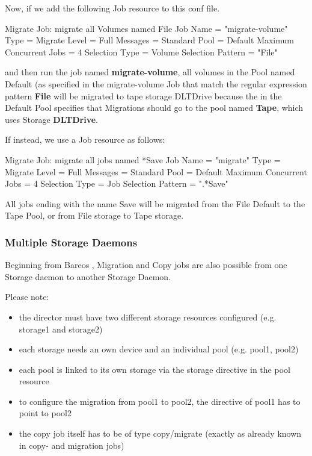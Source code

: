 Now, if we add the following Job resource to this conf file.

\begin{bconfig}{Migrate Job: migrate all Volumes named File}
Job {
  Name = "migrate-volume"
  Type = Migrate
  Level = Full
  Messages = Standard
  Pool = Default
  Maximum Concurrent Jobs = 4
  Selection Type = Volume
  Selection Pattern = "File"
}
\end{bconfig}

and then run the job named {\bf migrate-volume}, all volumes in the Pool
named Default (as specified in the migrate-volume Job that match the
regular expression pattern {\bf File} will be migrated to tape storage
DLTDrive because the  in the Default Pool specifies that
Migrations should go to the pool named {\bf Tape}, which uses
Storage {\bf DLTDrive}.

If instead, we use a Job resource as follows:

\begin{bconfig}{Migrate Job: migrate all jobs named *Save}
Job {
  Name = "migrate"
  Type = Migrate
  Level = Full
  Messages = Standard
  Pool = Default
  Maximum Concurrent Jobs = 4
  Selection Type = Job
  Selection Pattern = ".*Save"
}
\end{bconfig}

All jobs ending with the name Save will be migrated from the File Default to
the Tape Pool, or from File storage to Tape storage.

\subsubsection{Multiple Storage Daemons}
    \label{sec:CopyMigrationJobsMultipleStorageDaemons}

Beginning from Bareos , 
Migration and Copy jobs are also possible from one Storage daemon to another Storage Daemon.

Please note:
\begin{itemize}
 \item the director must have two different storage resources configured (e.g. storage1 and storage2)
    \item each storage needs an own device and an individual pool (e.g. pool1, pool2)
    \item each pool is linked to its own storage via the storage directive in the pool resource
    \item to configure the migration from pool1 to pool2, the  directive of pool1 has to point to pool2
    \item the copy job itself has to be of type copy/migrate (exactly as already known in copy- and migration jobs)
\end{itemize}

